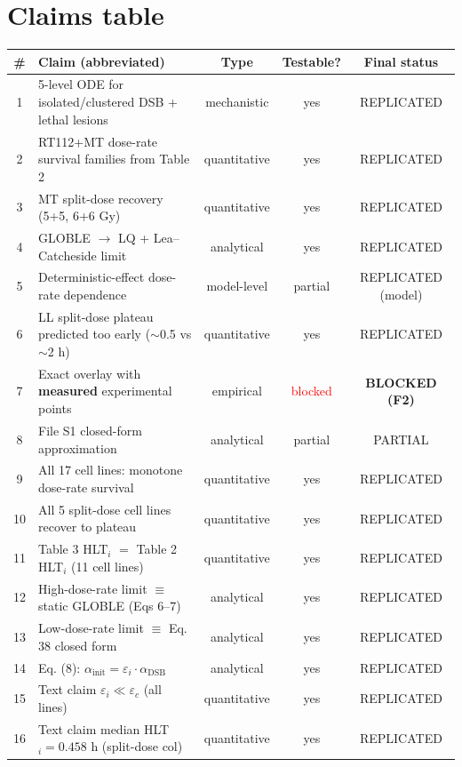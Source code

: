 \documentclass[11pt]{article}
\begin{document}
\section{Claims table}
\begin{longtable}{clccc}
\toprule
\# & Claim (abbreviated) & Type & Testable? & Final status \\
\midrule
\endhead
1  & 5-level ODE for isolated/clustered DSB + lethal lesions & mechanistic & yes & REPLICATED \\
2  & RT112+MT dose-rate survival families from Table 2      & quantitative & yes & REPLICATED \\
3  & MT split-dose recovery (5+5, 6+6 Gy)                   & quantitative & yes & REPLICATED \\
4  & GLOBLE $\to$ LQ + Lea--Catcheside limit               & analytical   & yes & REPLICATED \\
5  & Deterministic-effect dose-rate dependence             & model-level  & partial & REPLICATED (model) \\
6  & LL split-dose plateau predicted too early ($\sim$0.5 vs $\sim$2 h) & quantitative & yes & REPLICATED \\
7  & Exact overlay with \textbf{measured} experimental points & empirical & \textcolor{red}{blocked} & \textbf{BLOCKED (F2)} \\
8  & File S1 closed-form approximation                     & analytical & partial & PARTIAL \\
9  & All 17 cell lines: monotone dose-rate survival        & quantitative & yes & REPLICATED \\
10 & All 5 split-dose cell lines recover to plateau        & quantitative & yes & REPLICATED \\
11 & Table 3 HLT$_i$ $=$ Table 2 HLT$_i$ (11 cell lines)   & quantitative & yes & REPLICATED \\
12 & High-dose-rate limit $\equiv$ static GLOBLE (Eqs 6--7)& analytical & yes & REPLICATED \\
13 & Low-dose-rate limit $\equiv$ Eq. 38 closed form       & analytical & yes & REPLICATED \\
14 & Eq. (8): $\alpha_{\text{init}} = \varepsilon_i \cdot \alpha_{\text{DSB}}$ & analytical & yes & REPLICATED \\
15 & Text claim $\varepsilon_i \ll \varepsilon_c$ (all lines)& quantitative & yes & REPLICATED \\
16 & Text claim median HLT$_i = 0.458$ h (split-dose col)  & quantitative & yes & REPLICATED \\
\bottomrule
\end{longtable}
\end{document}
